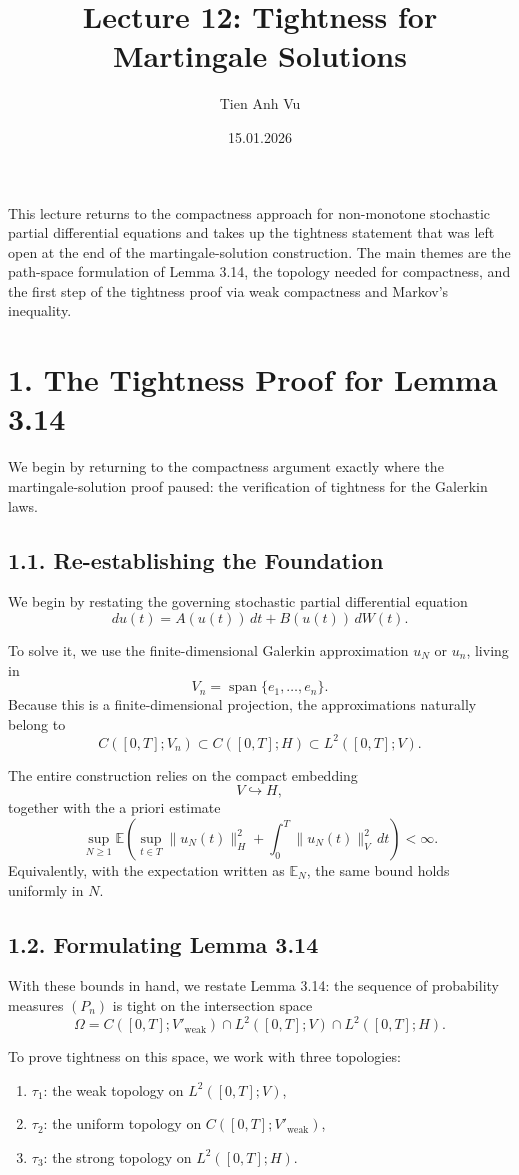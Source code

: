 \documentclass[11pt]{article}
\title{Lecture 12: Tightness for Martingale Solutions}
\date{15.01.2026}
\author{Tien Anh Vu}
\theoremstyle{definition}
\theoremstyle{remark}
\begin{document}
\maketitle

This lecture returns to the compactness approach for non-monotone stochastic partial differential equations and takes up the tightness statement that was left open at the end of the martingale-solution construction. The main themes are the path-space formulation of Lemma 3.14, the topology needed for compactness, and the first step of the tightness proof via weak compactness and Markov's inequality.

\section*{1. The Tightness Proof for Lemma 3.14}
We begin by returning to the compactness argument exactly where the martingale-solution proof paused: the verification of tightness for the Galerkin laws.

\subsection*{1.1. Re-establishing the Foundation}
We begin by restating the governing stochastic partial differential equation
\[
du(t)=A(u(t))\,dt+B(u(t))\,dW(t).
\]

To solve it, we use the finite-dimensional Galerkin approximation \(u_N\) or \(u_n\), living in
\[
V_n=\operatorname{span}\{e_1,\dots,e_n\}.
\]
Because this is a finite-dimensional projection, the approximations naturally belong to
\[
C([0,T];V_n)\subset C([0,T];H)\subset L^2([0,T];V).
\]

The entire construction relies on the compact embedding
\[
V\hookrightarrow H,
\]
together with the a priori estimate
\[
\sup_{N\ge 1}
\mathbb E\left(
\sup_{t\in T}\|u_N(t)\|_H^2
+
\int_0^T \|u_N(t)\|_V^2\,dt
\right)
<\infty.
\]
Equivalently, with the expectation written as \(\mathbb E_N\), the same bound holds uniformly in \(N\).

\subsection*{1.2. Formulating Lemma 3.14}
With these bounds in hand, we restate Lemma 3.14:
the sequence of probability measures \((P_n)\) is tight on the intersection space
\[
\Omega
=
C([0,T];V'_{\mathrm{weak}})
\cap
L^2([0,T];V)
\cap
L^2([0,T];H).
\]

To prove tightness on this space, we work with three topologies:
\begin{enumerate}
\item \(\tau_1\): the weak topology on \(L^2([0,T];V)\),
\item \(\tau_2\): the uniform topology on \(C([0,T];V'_{\mathrm{weak}})\),
\item \(\tau_3\): the strong topology on \(L^2([0,T];H)\).
\end{enumerate}
\end{document}
